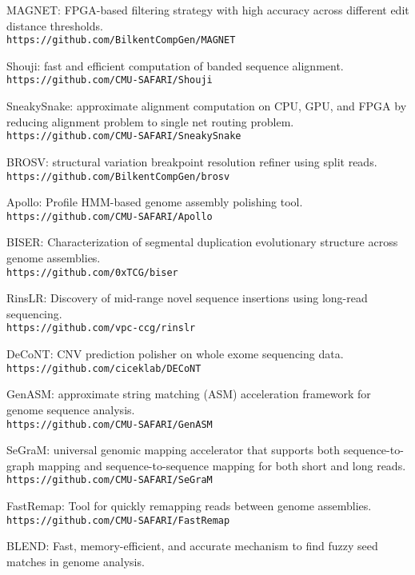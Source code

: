 \begin{list2}
\item
  MAGNET: FPGA-based filtering strategy with high accuracy across different edit distance thresholds.\\
  {\tt https://github.com/BilkentCompGen/MAGNET}
  
\item
  Shouji: fast and efficient computation of banded sequence alignment.
  {\tt https://github.com/CMU-SAFARI/Shouji}
\item
  SneakySnake: approximate alignment computation on CPU, GPU, and FPGA by reducing alignment problem to single net routing problem.
  {\tt https://github.com/CMU-SAFARI/SneakySnake}
\item
  BROSV: structural variation breakpoint resolution refiner using split reads.\\
  {\tt https://github.com/BilkentCompGen/brosv}
  \item
  Apollo: Profile HMM-based genome assembly polishing tool.
  {\tt https://github.com/CMU-SAFARI/Apollo}
  \item
  BISER: Characterization of segmental duplication evolutionary structure across genome assemblies.\\
  {\tt https://github.com/0xTCG/biser}
  \item
  RinsLR: Discovery of mid-range novel sequence insertions using long-read sequencing.\\
  {\tt https://github.com/vpc-ccg/rinslr}
  \item
DeCoNT: CNV prediction polisher on whole exome sequencing data.\\
{\tt https://github.com/ciceklab/DECoNT}
  \item
GenASM: approximate string matching (ASM) acceleration framework for genome sequence analysis.\\
  {\tt https://github.com/CMU-SAFARI/GenASM}
  \item
  SeGraM: universal genomic mapping accelerator that supports both sequence-to-graph mapping and sequence-to-sequence mapping for both short and long reads.\\
{\tt https://github.com/CMU-SAFARI/SeGraM}
  \item
FastRemap: Tool for quickly remapping reads between genome assemblies.\\
{\tt https://github.com/CMU-SAFARI/FastRemap}
  \item
BLEND: Fast, memory-efficient, and accurate mechanism to find fuzzy seed matches in genome analysis.\\

\end{list2}
